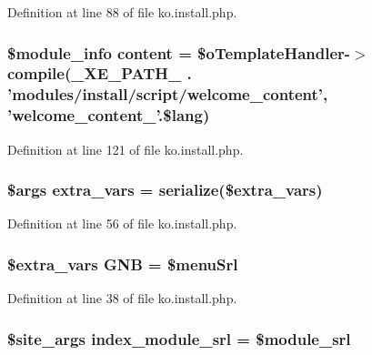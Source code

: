 Definition at line 88 of file ko.\+install.\+php.

\hypertarget{ko_8install_8php_a65dddc3e5e47cb506e6b5417ffb3bdef}{
\subsubsection[{content}]{\setlength{\rightskip}{0pt plus 5cm}\$module\+\_\+info {\bf content} = \$o\+Template\+Handler-\/$>$compile({\bf \+\_\+\+X\+E\+\_\+\+P\+A\+T\+H\+\_\+} . 'modules/{\bf install}/script/welcome\+\_\+content', 'welcome\+\_\+content\+\_\+'.\$lang)}}\label{ko_8install_8php_a65dddc3e5e47cb506e6b5417ffb3bdef}


Definition at line 121 of file ko.\+install.\+php.

\hypertarget{ko_8install_8php_ae1dcb37fc34a8f312d2e6abd6f806743}{
\subsubsection[{extra\+\_\+vars}]{\setlength{\rightskip}{0pt plus 5cm}\$args extra\+\_\+vars = serialize(\$extra\+\_\+vars)}}\label{ko_8install_8php_ae1dcb37fc34a8f312d2e6abd6f806743}


Definition at line 56 of file ko.\+install.\+php.

\hypertarget{ko_8install_8php_a9b1716b68fc04f3492448f38148dcbf5}{
\subsubsection[{G\+N\+B}]{\setlength{\rightskip}{0pt plus 5cm}\${\bf extra\+\_\+vars} G\+N\+B = \$menu\+Srl}}\label{ko_8install_8php_a9b1716b68fc04f3492448f38148dcbf5}


Definition at line 38 of file ko.\+install.\+php.

\hypertarget{ko_8install_8php_acd0b17bfe6d14c82871d73fa39c9c22d}{
\subsubsection[{index\+\_\+module\+\_\+srl}]{\setlength{\rightskip}{0pt plus 5cm}\$site\+\_\+args index\+\_\+module\+\_\+srl = \${\bf module\+\_\+srl}}}\label{ko_8install_8php_acd0b17bfe6d14c82871d73fa39c9c22d}


